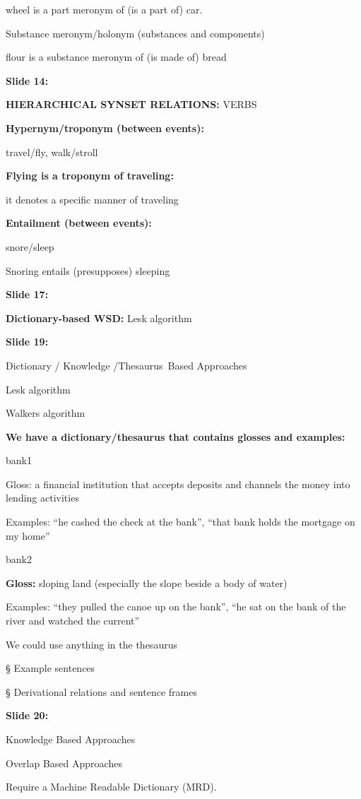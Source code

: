 \documentclass[11pt,a4paper]{article}
\begin{document}
wheel is a part meronym of (is a part of) car.

Substance meronym/holonym (substances and components)

flour is a substance meronym of (is made of) bread

\textbf{Slide 14:}

\textbf{HIERARCHICAL SYNSET RELATIONS:}  VERBS

\textbf{Hypernym/troponym (between events):} 

travel/fly, walk/stroll

\textbf{Flying is a troponym of traveling:} 

it denotes a specific manner of traveling

\textbf{Entailment (between events):} 

snore/sleep

Snoring entails (presupposes) sleeping

\textbf{Slide 17:}

\textbf{Dictionary-based WSD:}  Lesk algorithm

\textbf{Slide 19:}

Dictionary / Knowledge /Thesaurus Based Approaches

Lesk algorithm

Walkers algorithm

\textbf{We have a dictionary/thesaurus that contains glosses and examples:} 

bank1

Gloss: a financial institution that accepts deposits and channels the money into lending activities

Examples: “he cashed the check at the bank”, “that bank holds the mortgage on my home”

bank2

\textbf{Gloss:}  sloping land (especially the slope beside a body of water)

Examples: “they pulled the canoe up on the bank”, “he sat on the bank of the river and watched the current”

We could use anything in the thesaurus

§ Example sentences

§ Derivational relations and sentence frames

\textbf{Slide 20:}

Knowledge Based Approaches

Overlap Based Approaches

Require a Machine Readable Dictionary (MRD).
\end{document}
